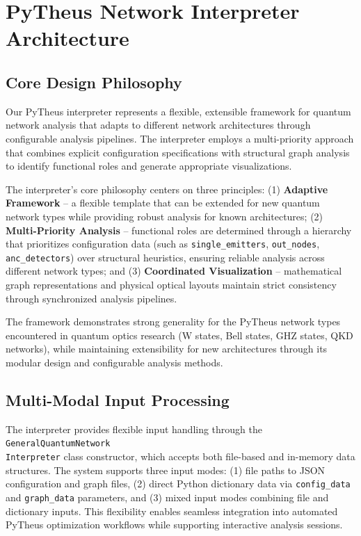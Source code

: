 \documentclass[11pt,a4paper]{article}
\begin{document}
\section{PyTheus Network Interpreter Architecture}

\subsection{Core Design Philosophy}

Our PyTheus interpreter represents a flexible, extensible framework for quantum network analysis that adapts to different network architectures through configurable analysis pipelines. The interpreter employs a multi-priority approach that combines explicit configuration specifications with structural graph analysis to identify functional roles and generate appropriate visualizations.

The interpreter's core philosophy centers on three principles: (1) \textbf{Adaptive Framework} -- a flexible template that can be extended for new quantum network types while providing robust analysis for known architectures; (2) \textbf{Multi-Priority Analysis} -- functional roles are determined through a hierarchy that prioritizes configuration data (such as \texttt{single\_emitters}, \texttt{out\_nodes}, \texttt{anc\_detectors}) over structural heuristics, ensuring reliable analysis across different network types; and (3) \textbf{Coordinated Visualization} -- mathematical graph representations and physical optical layouts maintain strict consistency through synchronized analysis pipelines.

The framework demonstrates strong generality for the PyTheus network types encountered in quantum optics research (W states, Bell states, GHZ states, QKD networks), while maintaining extensibility for new architectures through its modular design and configurable analysis methods.

\subsection{Multi-Modal Input Processing}

The interpreter provides flexible input handling through the \texttt{General\-Quantum\-Network\-\\Interpreter} class constructor, which accepts both file-based and in-memory data structures. The system supports three input modes: (1) file paths to JSON configuration and graph files, (2) direct Python dictionary data via \texttt{config\_data} and \texttt{graph\_data} parameters, and (3) mixed input modes combining file and dictionary inputs. This flexibility enables seamless integration into automated PyTheus optimization workflows while supporting interactive analysis sessions.
\end{document}
